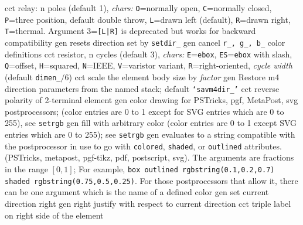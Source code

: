   {cct}
  {relay: n poles (default 1), {\sl chars:} {\tt O}=normally open,
    {\tt C}=normally closed, {\tt P}=three position, default double throw,
    {\tt L}=drawn left (default),
    {\tt R}=drawn right, {\tt T}=thermal.
    Argument 3={\tt [L|R]} is deprecated but works for
    backward compatibility
   }
  {gen}
  {resets direction set by {\tt setdir\_}}
  {gen}
  {cancel {\tt r\_, g\_, b\_} color definitions}
  {cct}
  {resistor, n cycles (default 3), {\sl chars:}
    {\tt E}={\tt ebox},
    {\tt ES}={\tt ebox} with slash,
    {\tt Q}=offset,
    {\tt H}=squared,
    {\tt N}=IEEE,
    {\tt V}=varistor variant,
    {\tt R}=right-oriented,
    {\sl cycle width} (default {\tt dimen\_}$/6$) }
  {cct}
  {scale the element body size by {\sl factor}}
  {gen}
  {Restore m4 direction parameters from the named stack;
    default {\tt `savm4dir\_'}}
  {cct}
  {reverse polarity of 2-terminal element}
  {gen}
  {color drawing for PSTricks, pgf, MetaPost, svg postprocessors;
   (color entries are 0 to 1 except for SVG entries which are 0 to 255),
   see {\tt setrgb} }
  {gen}
  {fill with arbitrary color (color entries are 0 to 1 except 
   SVG entries which are 0 to 255); see {\tt setrgb}}
  {gen}
  {evaluates to a string compatible with the postprocessor in use
   to go with {\tt colored}, {\tt shaded}, or {\tt outlined} attributes.
   (PSTricks, metapost, pgf-tikz, pdf, postscript, svg).
   The arguments are fractions
   in the range $[0,1]$; For example,
   {\tt box outlined rgbstring(0.1,0.2,0.7) shaded rgbstring(0.75,0.5,0.25)}.
   For those postprocessors that allow it,
   there can be one argument which is the name of a defined color}
  {gen}
  {set current direction right }
  {gen}
  {right justify with respect to current direction}
  {cct}
  {triple label on right side of the element }
